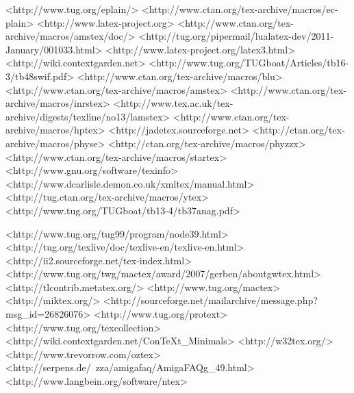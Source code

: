	<http://www.tug.org/eplain/>
	<http://www.ctan.org/tex-archive/macros/ec-plain>
	<http://www.latex-project.org>
	<http://www.ctan.org/tex-archive/macros/amstex/doc/>
	<http://tug.org/pipermail/lualatex-dev/2011-January/001033.html>
	<http://www.latex-project.org/latex3.html>
	<http://wiki.contextgarden.net>
	<http://www.tug.org/TUGboat/Articles/tb16-3/tb48swif.pdf>
	<http://www.ctan.org/tex-archive/macros/blu>
	<http://www.ctan.org/tex-archive/macros/amstex>
	<http://www.ctan.org/tex-archive/macros/inrstex>
	<http://www.tex.ac.uk/tex-archive/digests/texline/no13/lamstex>
	<http://www.ctan.org/tex-archive/macros/hptex>
	<http://jadetex.sourceforge.net>
	<http://ctan.org/tex-archive/macros/physe>
	<http://ctan.org/tex-archive/macros/phyzzx>
	<http://www.ctan.org/tex-archive/macros/startex>
	<http://www.gnu.org/software/texinfo>
	<http://www.dcarlisle.demon.co.uk/xmltex/manual.html>
	<http://tug.ctan.org/tex-archive/macros/ytex>
	<http://www.tug.org/TUGboat/tb13-4/tb37anag.pdf>

	<http://www.tug.org/tug99/program/node39.html>
	<http://tug.org/texlive/doc/texlive-en/texlive-en.html>
	<http://ii2.sourceforge.net/tex-index.html>
	<http://www.tug.org/twg/mactex/award/2007/gerben/aboutgwtex.html>
	<http://tlcontrib.metatex.org/>
	<http://www.tug.org/mactex>
	<http://miktex.org/>
	<http://sourceforge.net/mailarchive/message.php?msg_id=26826076>
	<http://www.tug.org/protext>
	<http://www.tug.org/texcollection>
	<http://wiki.contextgarden.net/ConTeXt_Minimals>
	<http://w32tex.org/>
	<http://www.trevorrow.com/oztex>
	<http://serpens.de/~zza/amigafaq/AmigaFAQg_49.html>
	<http://www.langbein.org/software/ntex>

